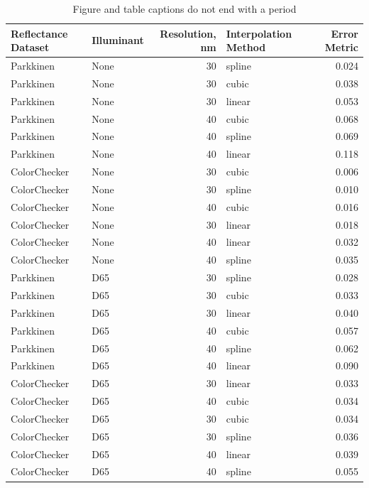 \documentclass[twocolumn,10pt]{asme2ej}
\begin{document}
\begin{table}[t]
\begin{center}
\begin{tabular}{l l r l r}
\hline
\textbf{Reflectance Dataset} & \textbf{Illuminant} & \textbf{Resolution, nm} & \textbf{Interpolation Method} & \textbf{Error Metric} \\
\hline
Parkkinen & None & 30 & spline & 0.024  \\
Parkkinen & None & 30 & cubic  & 0.038  \\
Parkkinen & None & 30 & linear & 0.053  \\
Parkkinen & None & 40 & cubic  & 0.068  \\
Parkkinen & None & 40 & spline & 0.069  \\
Parkkinen & None & 40 & linear & 0.118  \\
\hline
ColorChecker & None & 30 & cubic  & 0.006  \\
ColorChecker & None & 30 & spline & 0.010  \\
ColorChecker & None & 40 & cubic  & 0.016  \\
ColorChecker & None & 30 & linear & 0.018  \\
ColorChecker & None & 40 & linear & 0.032  \\
ColorChecker & None & 40 & spline & 0.035  \\
\hline
Parkkinen & D65 & 30 & spline & 0.028  \\
Parkkinen & D65 & 30 & cubic  & 0.033  \\
Parkkinen & D65 & 30 & linear & 0.040  \\
Parkkinen & D65 & 40 & cubic  & 0.057  \\
Parkkinen & D65 & 40 & spline & 0.062  \\
Parkkinen & D65 & 40 & linear & 0.090  \\
\hline
ColorChecker & D65 & 30 & linear & 0.033  \\
ColorChecker & D65 & 40 & cubic  & 0.034  \\
ColorChecker & D65 & 30 & cubic  & 0.034  \\
ColorChecker & D65 & 30 & spline & 0.036  \\
ColorChecker & D65 & 40 & linear & 0.039  \\
ColorChecker & D65 & 40 & spline & 0.055  \\
\hline
\end{tabular}
\caption{Figure and table captions do not end with a period}
\label{table_reconstruction}
\end{center}
\end{table}
\end{document}

